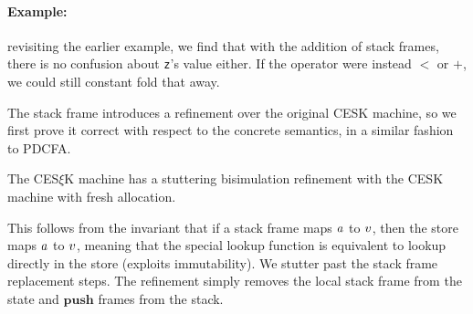 
\paragraph{Example:} revisiting the earlier example, we find that with the addition of stack frames, there is no confusion about \texttt{z}'s value either.
%
If the operator were instead $<$ or $+$, we could still constant fold that away.

The stack frame introduces a refinement over the original CESK machine, so we first prove it correct with respect to the concrete semantics, in a similar fashion to PDCFA.
%
\begin{theorem}\label{thm:refinement}
  The CES$\xi$K machine has a stuttering bisimulation refinement with the CESK machine with fresh allocation.
\end{theorem}
This follows from the invariant that if a stack frame maps $a$ to $v$, then the store maps $a$ to $v$, meaning that the special lookup function is equivalent to lookup directly in the store (exploits immutability).
%
We stutter past the stack frame replacement steps.
%
The refinement simply removes the local stack frame from the state and $\mathbf{push}$ frames from the stack.
%
%
%
%
%


